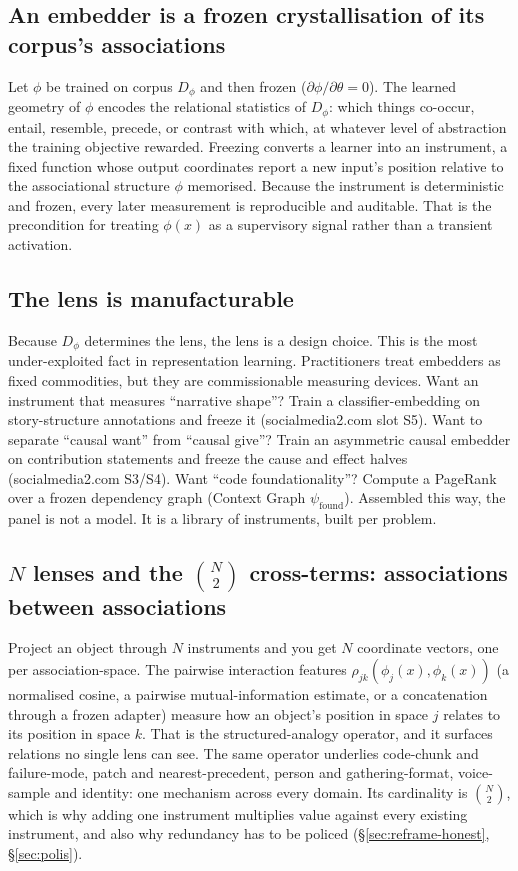 \documentclass[10pt,twocolumn]{article}
\begin{document}
\subsection{An embedder is a frozen crystallisation of its corpus's associations}
Let $\phi$ be trained on corpus $D_\phi$ and then frozen
($\partial\phi/\partial\theta = 0$). The learned geometry of $\phi$ encodes the
relational statistics of $D_\phi$: which things co-occur, entail, resemble,
precede, or contrast with which, at whatever level of abstraction the training
objective rewarded. Freezing converts a learner into an instrument, a fixed
function whose output coordinates report a new input's position relative to the
associational structure $\phi$ memorised. Because the instrument is deterministic
and frozen, every later measurement is reproducible and auditable. That is the
precondition for treating $\phi(x)$ as a supervisory signal rather than a
transient activation.

\subsection{The lens is manufacturable}
Because $D_\phi$ determines the lens, the lens is a design choice. This is the
most under-exploited fact in representation learning. Practitioners treat
embedders as fixed commodities, but they are commissionable measuring devices.
Want an instrument that measures ``narrative shape''? Train a classifier-embedding
on story-structure annotations and freeze it (socialmedia2.com slot S5). Want to separate
``causal want'' from ``causal give''? Train an asymmetric causal embedder on
contribution statements and freeze the cause and effect halves (socialmedia2.com S3/S4).
Want ``code foundationality''? Compute a PageRank over a frozen dependency graph
(Context Graph $\psi_{\mathrm{found}}$). Assembled this way, the panel is not a
model. It is a library of instruments, built per problem.

\subsection{$N$ lenses and the $\binom{N}{2}$ cross-terms: associations between
associations}
Project an object through $N$ instruments and you get $N$ coordinate vectors, one
per association-space. The pairwise interaction features
$\rho_{jk}(\phi_j(x),\phi_k(x))$ (a normalised cosine, a pairwise
mutual-information estimate, or a concatenation through a frozen adapter) measure
how an object's position in space $j$ relates to its position in space $k$. That
is the structured-analogy operator, and it surfaces relations no single lens can
see. The same operator underlies code-chunk and failure-mode, patch and
nearest-precedent, person and gathering-format, voice-sample and identity: one
mechanism across every domain. Its cardinality is $\binom{N}{2}$, which is why
adding one instrument multiplies value against every existing instrument, and
also why redundancy has to be policed (\S\ref{sec:reframe-honest},
\S\ref{sec:polis}).
\end{document}
